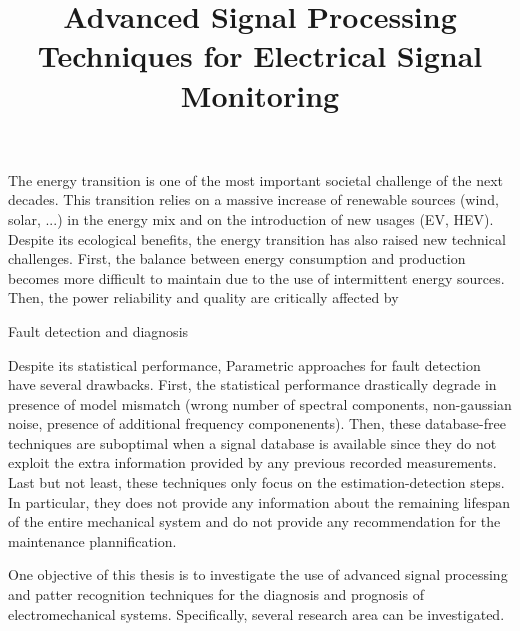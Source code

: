 \documentclass{article}
\begin{document}
\title{Advanced Signal Processing Techniques for Electrical Signal Monitoring}
   
 \maketitle  
 
The energy transition is one of the most important societal challenge of the next decades. This transition relies on a massive increase of renewable sources (wind, solar, ...) in the energy mix and on the introduction of new usages (EV, HEV). Despite its ecological benefits, the energy transition has also raised new technical challenges. First, the balance between energy consumption and production becomes more difficult to maintain due to the use of intermittent energy sources. Then, the power reliability and quality are critically affected by 


Fault detection and diagnosis

Despite its statistical performance, Parametric approaches for fault detection have several drawbacks. First, the statistical performance drastically degrade in presence of model mismatch (wrong number of spectral components, non-gaussian noise, presence of additional frequency componenents). Then, these database-free techniques are suboptimal when a signal database is available since they do not exploit the extra information provided by any previous recorded measurements.
Last but not least, these techniques only focus on the estimation-detection steps. In particular, they does not provide any information about the remaining lifespan of the entire mechanical system and do not provide any recommendation for the maintenance plannification.

One objective of this thesis is to investigate the use of advanced signal processing and patter recognition techniques for the diagnosis and prognosis of electromechanical systems. Specifically, several research area can be investigated.
\end{document}
